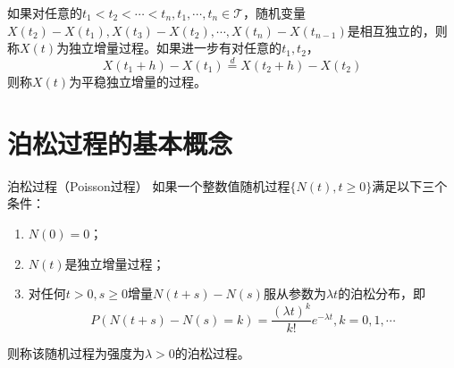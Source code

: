 \begin{definition}
    如果对任意的$t_1<t_2<\cdots<t_n,t_1,\cdots,t_n\in \mathcal{T}$，随机变量$X(t_2)-X(t_1),X(t_3)-X(t_2),\cdots,X(t_n)-X(t_{n-1})$是相互独立的，则称$X(t)$为独立增量过程。如果进一步有对任意的$t_1,t_2$，$$
        X(t_1+h) - X(t_1) \overset{d}{=} X(t_2+h) - X(t_2)
    $$
    则称$X(t)$为平稳独立增量的过程。
\end{definition}


\section{泊松过程的基本概念}
\begin{definition}{泊松过程（Poisson过程）}
    如果一个整数值随机过程$\{N(t),t\geq 0\}$满足以下三个条件：
    \begin{enumerate}
        \item  $N(0) = 0$；
        \item $N(t)$是独立增量过程；
        \item 对任何$t>0, s\geq 0$增量$N(t+s) - N(s)$服从参数为$\lambda t$的泊松分布，即
              $$
                  P(N(t+s) - N(s) = k)  = \frac{(\lambda t)^k }{k!}e^{-\lambda t}, k=0,1,\cdots
              $$
    \end{enumerate}
    则称该随机过程为强度为$\lambda >0$的泊松过程。
\end{definition}

